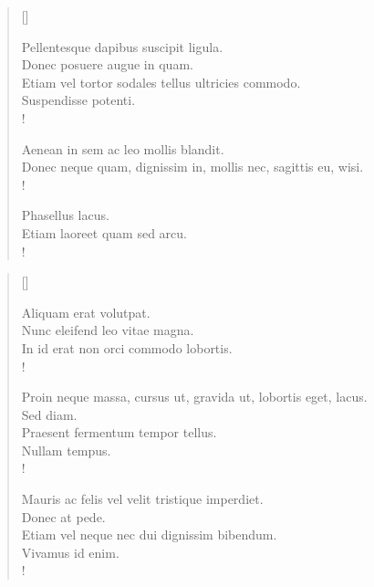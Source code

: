\documentclass[11pt, a4paper]{article} %
\begin{document}
\newpage
\pagestyle{plain}


\settowidth{\versewidth}{xxxxxxxxxxxxxxxxxxxxxxxxxxxxxxxxxxx}
\begin{verse}[\versewidth]

Pellentesque dapibus suscipit ligula. \\
Donec posuere augue in quam. \\
Etiam vel tortor sodales tellus ultricies commodo. \\
Suspendisse potenti. \\!

Aenean in sem ac leo mollis blandit. \\
Donec neque quam, dignissim in, mollis nec, sagittis eu, wisi. \\!

Phasellus lacus. \\
Etiam laoreet quam sed arcu. \\!

\end{verse}
\newpage


\settowidth{\versewidth}{xxxxxxxxxxxxxxxxxxxxxxxxxxxxxx}
\begin{verse}[\versewidth]

Aliquam erat volutpat. \\
Nunc eleifend leo vitae magna. \\
In id erat non orci commodo lobortis. \\!

Proin neque massa, cursus ut, gravida ut, lobortis eget, lacus. \\
Sed diam. \\
Praesent fermentum tempor tellus. \\
Nullam tempus. \\!

Mauris ac felis vel velit tristique imperdiet. \\
Donec at pede. \\
Etiam vel neque nec dui dignissim bibendum. \\
Vivamus id enim. \\!

\end{verse}
\newpage
\end{document}
